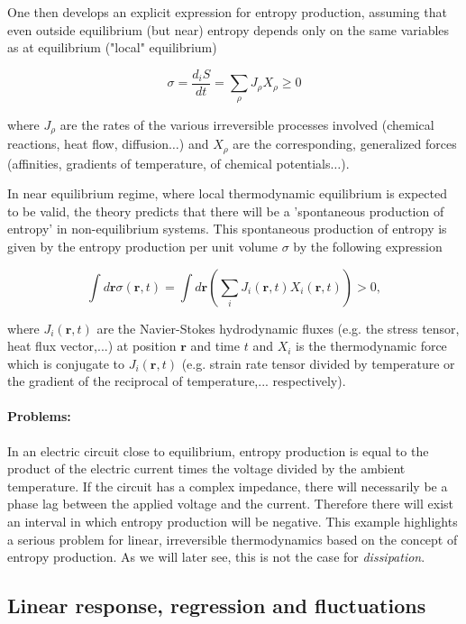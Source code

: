 \documentclass[a4paper,12pt]{article}
\begin{document}
One then develops an explicit expression for entropy production, assuming that even outside equilibrium (but near) entropy depends only on the same
variables as at equilibrium ("local" equilibrium)

\begin{equation}
  	\sigma=\frac{d_iS}{dt}=\sum _{\rho } J_{\rho }X_{\rho }\geq 0
\end{equation}

where \(J_{\rho }\) are the rates of the various irreversible processes involved (chemical reactions, heat flow, diffusion$\ldots $) and \(X_{\rho
}\) are the corresponding, generalized forces (affinities, gradients of temperature, of chemical potentials$\ldots $).


In near equilibrium regime, where local thermodynamic equilibrium is expected to be valid, the theory predicts that there will be a 'spontaneous production of entropy' in non-equilibrium systems.
This spontaneous production of entropy is given by the entropy production per unit volume $\sigma$ by the following expression \cite{DeGroot:2013ue}

\begin{equation}
    \int d\bm{r} \sigma(\bm{r},t)=\int d\bm{r}(\sum_i J_i(\bm{r},t)X_i(\bm{r},t))>0,
\end{equation}

where $J_i(\bm{r},t)$ are the Navier-Stokes hydrodynamic fluxes (e.g. the stress tensor, heat flux vector,...) at position $\bm{r}$ and time $t$ and $X_i$ is the thermodynamic force which is conjugate to $J_i(\bm{r},t)$ (e.g. strain rate tensor divided by temperature or the gradient of the reciprocal of temperature,... respectively).

\paragraph{Problems:}
In an electric circuit close to equilibrium, entropy production is equal to the product of the electric current times the voltage divided by the ambient temperature. If the circuit has a complex impedance, there will necessarily be a phase lag between the applied voltage and the current. Therefore there will exist an interval in which entropy production will be negative. 
This example highlights a serious problem for linear, irreversible thermodynamics based on the concept of entropy production. As we will later see, this is not the case for \textit{dissipation}.

\subsection{Linear response, regression and fluctuations}
\end{document}
